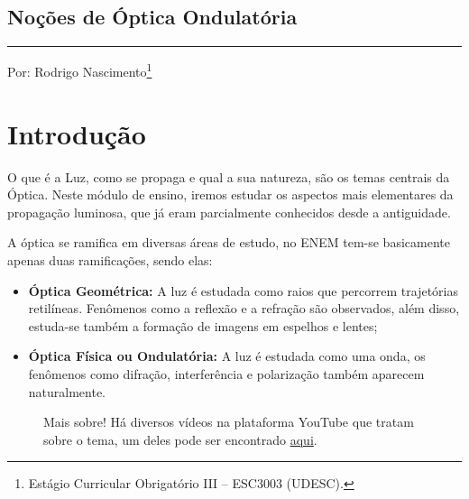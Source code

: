 \begin{center}
    
    \section{Noções de Óptica Ondulatória}
\end{center}
\begin{flushright}
    
     
    \rule{.33\textwidth}{.5pt}
    \renewcommand{\thefootnote}{\fnsymbol{footnote}}
    \par\noindent Por: Rodrigo Nascimento\footnote[2]{Estágio Curricular Obrigatório III -- ESC3003 (UDESC).} 
\end{flushright}


\section*{Introdução}       

O que é a Luz, como se propaga e qual a sua natureza, são os temas centrais da Óptica. Neste módulo de ensino, iremos estudar os aspectos mais elementares da propagação luminosa, que já eram parcialmente conhecidos desde a antiguidade.

A óptica se ramifica em diversas áreas de estudo, no ENEM tem-se basicamente apenas duas ramificações, sendo elas:
\begin{itemize}
    \item \textbf{Óptica Geométrica:} A luz é estudada como raios que percorrem trajetórias retilíneas. Fenômenos como a reflexão e a refração são observados, além disso, estuda-se também a formação de imagens em espelhos e lentes;
    \item \textbf{Óptica Física ou Ondulatória:} A luz é estudada como uma onda, os fenômenos como difração, interferência e polarização também aparecem naturalmente.
\end{itemize}

\setlength\intextsep{-20pt}
\begin{figure}
    \centering
    \begin{mybox}[colback=white, colframe=cyan,colbacktitle=cyan!85!cyan,]{Mais sobre!}
        Há diversos vídeos na plataforma YouTube que tratam sobre o tema, um deles pode ser encontrado \href{https://youtu.be/oSUHXeiaQ98}{aqui}.
    \end{mybox}    
\end{figure}

